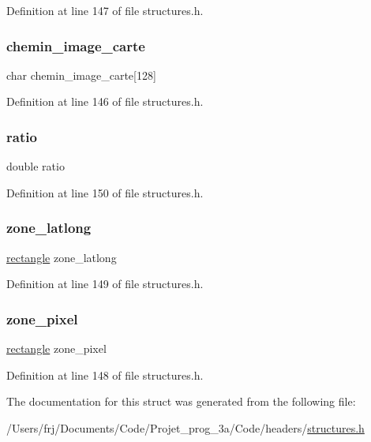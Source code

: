 Definition at line 147 of file structures.\+h.

\hypertarget{structcarte_a14ecc94c2719b58bbfd7b6249ff3ad4b}{}\label{structcarte_a14ecc94c2719b58bbfd7b6249ff3ad4b} 
\subsubsection{\texorpdfstring{chemin\+\_\+image\+\_\+carte}{chemin\_image\_carte}}
{\footnotesize\ttfamily char chemin\+\_\+image\+\_\+carte\mbox{[}128\mbox{]}}



Definition at line 146 of file structures.\+h.

\hypertarget{structcarte_aa422b0077d0c570937a73aa5b8eb4440}{}\label{structcarte_aa422b0077d0c570937a73aa5b8eb4440} 
\subsubsection{\texorpdfstring{ratio}{ratio}}
{\footnotesize\ttfamily double ratio}



Definition at line 150 of file structures.\+h.

\hypertarget{structcarte_ad42edc35194368fcf17c221930cbabe0}{}\label{structcarte_ad42edc35194368fcf17c221930cbabe0} 
\subsubsection{\texorpdfstring{zone\+\_\+latlong}{zone\_latlong}}
{\footnotesize\ttfamily \hyperlink{structrectangle}{rectangle} zone\+\_\+latlong}



Definition at line 149 of file structures.\+h.

\hypertarget{structcarte_addf5558f9faa154e716d68678b042f98}{}\label{structcarte_addf5558f9faa154e716d68678b042f98} 
\subsubsection{\texorpdfstring{zone\+\_\+pixel}{zone\_pixel}}
{\footnotesize\ttfamily \hyperlink{structrectangle}{rectangle} zone\+\_\+pixel}



Definition at line 148 of file structures.\+h.



The documentation for this struct was generated from the following file\+:\begin{DoxyCompactItemize}
\item 
/\+Users/frj/\+Documents/\+Code/\+Projet\+\_\+prog\+\_\+3a/\+Code/headers/\hyperlink{structures_8h}{structures.\+h}\end{DoxyCompactItemize}
